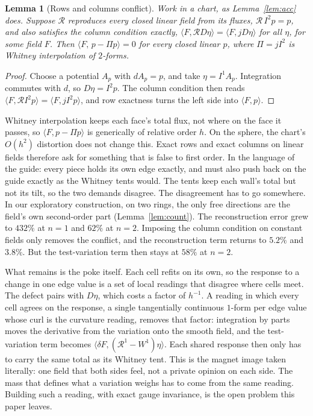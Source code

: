 \documentclass[11pt]{article}
\newtheorem{lemma}[theorem]{Lemma}
\theoremstyle{definition}
\theoremstyle{remark}
\newcommand{\cR}{\mathcal{R}}
\begin{document}
\begin{lemma}[Rows and columns conflict]\label{lem:conflict}
Work in a chart, as Lemma~\ref{lem:acc} does. Suppose $\cR$ reproduces every closed linear
field from its fluxes, $\cR\,I^2p=p$, and also
satisfies the column condition exactly,
$\langle F,\cR D\eta\rangle=\langle F,jD\eta\rangle$ for all $\eta$, for some field $F$. Then
$\langle F,\,p-\Pi p\rangle=0$ for every closed linear $p$, where $\Pi=jI^2$ is Whitney
interpolation of $2$-forms.
\end{lemma}
\begin{proof}
Choose a potential $A_p$ with $dA_p=p$, and take $\eta=I^1A_p$. Integration commutes with
$d$, so $D\eta=I^2p$. The column condition then reads
$\langle F,\cR I^2p\rangle=\langle F,jI^2p\rangle$, and row exactness turns the left side
into $\langle F,p\rangle$.
\end{proof}

Whitney interpolation keeps each face's total flux, not where on the face it passes, so
$\langle F,p-\Pi p\rangle$ is generically of relative order $h$. On the sphere, the chart's
$O(h^2)$ distortion does not change this. Exact rows and exact columns on
linear fields therefore ask for something that is false to first order. In the language of
the guide: every piece holds its own edge exactly, and must also push back on the guide
exactly as the Whitney tents would. The tents keep each wall's total but not its tilt, so
the two demands disagree. The disagreement has to go somewhere. In our exploratory
construction, on two rings, the only free directions are the field's own second-order part
(Lemma~\ref{lem:count}). The reconstruction error grew to $432\%$ at $n=1$ and $62\%$ at
$n=2$. Imposing the column condition on constant fields only removes the conflict, and the
reconstruction term returns to $5.2\%$ and $3.8\%$. But the test-variation term then stays
at $58\%$ at $n=2$.

What remains is the poke itself. Each cell refits on its own, so the response to a change in
one edge value is a set of local readings that disagree where cells meet. The defect pairs
with $D\eta$, which costs a factor of $h^{-1}$. A reading in which every cell agrees on the
response, a single tangentially continuous $1$-form per edge value whose curl is the
curvature reading, removes that factor: integration by parts moves the derivative from the
variation onto the smooth field, and the test-variation term becomes
$\langle\delta F,(\cR^1-W^1)\eta\rangle$. Each shared response then only has to carry the same
total as its Whitney tent. This is the magnet image taken literally: one field that both sides
feel, not a private opinion on each side. The mass that defines what a variation weighs has to
come from the same reading. Building such a reading, with exact gauge invariance, is the open
problem this paper leaves.
\end{document}
